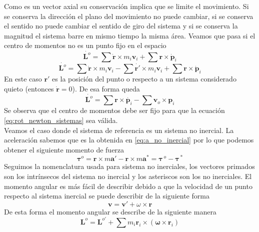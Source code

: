 \documentclass[a4paper]{article}
\numberwithin{equation}{section}
\begin{document}
	Como es un vector axial su conservación implica que se limite el movimiento. Si se conserva la dirección el plano del movimiento no puede cambiar, si se conserva el sentido no puede cambiar el sentido de giro del sistema y si se conserva la magnitud el sistema barre en mismo tiempo la misma área.
	Veamos que pasa si el centro de momentos no es un punto fijo en el espacio
	\begin{equation*}
		\dot{\boldsymbol{L}^{o}} = \sum \dot{\boldsymbol{r}} \times m_i \boldsymbol{v}_i + \sum \boldsymbol{r} \times \dot{\boldsymbol{p}}_i
	\end{equation*}
	\begin{equation*}
		\dot{\boldsymbol{L}^{o}} = \sum \dot{\boldsymbol{r}} \times m_i \boldsymbol{v}_i - \sum \dot{\boldsymbol{r}'} \times m_i \boldsymbol{v}_i + \sum \boldsymbol{r} \times \dot{\boldsymbol{p}}_i
	\end{equation*}
	En este caso $\boldsymbol{r}'$ es la posición del punto o respecto a un sistema considerado quieto (entonces $\dot{\boldsymbol{r}} = 0$). De esa forma queda
	\begin{equation}
		\dot{\boldsymbol{L}^{o}} = \sum \boldsymbol{r} \times \dot{\boldsymbol{p}_i} - \sum \boldsymbol{v}_o \times \boldsymbol{p}_i
	\end{equation}
	Se observa que el centro de momentos debe ser fijo para que la ecuación \ref{eq:rot_newton_sistemas} sea válida. \\
	Veamos el caso donde el sistema de referencia es un sistema no inercial. La aceleración sabemos que es la obtenida en \ref{eq:a_no_inercial} por lo que podemos obtener el siguiente momento de fuerza
	\begin{equation}
		\boldsymbol{\tau}^{o} = \boldsymbol{r} \times m \boldsymbol{a}' - \boldsymbol{r} \times m \boldsymbol{a}^{\ast} = \boldsymbol{\tau}^{\,o} - \boldsymbol{\tau}^{\,\ast}
	\end{equation}
	Seguimos la nomenclatura usada para sistema no inerciales, los vectores primados son los intrínsecos del sistema no inercial y los asteriscos son los no inerciales. El momento angular es más fácil de describir debido a que la velocidad de un punto respecto al sistema inercial se puede describir de la siguiente forma
	\begin{equation*}
		\boldsymbol{v} = \boldsymbol{v}' + \omega \times \boldsymbol{r}
	\end{equation*}
	De esta forma el momento angular se describe de la siguiente manera
	\begin{equation}
		\boldsymbol{L}^{o} = \boldsymbol{L}^{o'} + \sum m_i \boldsymbol{r}_i \times (\boldsymbol{\omega} \times \boldsymbol{r}_i)
	\end{equation}
\end{document}
